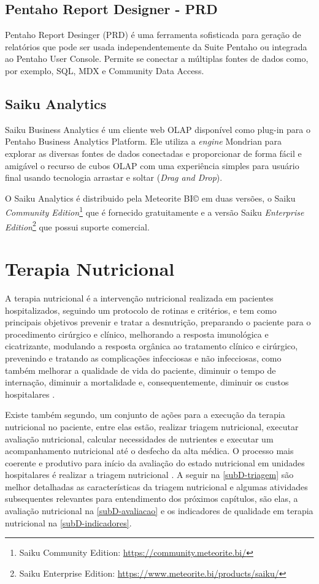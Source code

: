 \subsection{Pentaho Report Designer - PRD}
Pentaho Report Desinger (PRD) é uma ferramenta sofisticada para geração de relatórios que pode ser usada independentemente da Suite Pentaho ou integrada ao Pentaho User Console. Permite se conectar a múltiplas fontes de dados como, por exemplo, SQL, MDX e Community Data Access.

\subsection{Saiku Analytics}
Saiku Business Analytics é um cliente web OLAP disponível como plug-in para o Pentaho Business Analytics Platform. Ele utiliza a \textit{engine} Mondrian para explorar as diversas fontes de dados conectadas e proporcionar de forma fácil e amigável o recurso de cubos OLAP com uma experiência simples para usuário final usando tecnologia arrastar e soltar (\textit{Drag and Drop}). 

O Saiku Analytics é distribuido pela Meteorite BI© em duas versões, o Saiku \textit{Community Edition}\footnote{Saiku Community Edition: \url{https://community.meteorite.bi/}} que é fornecido gratuitamente e a versão Saiku \textit{Enterprise Edition}\footnote{Saiku Enterprise Edition: \url{https://www.meteorite.bi/products/saiku/}} que possui suporte comercial.

\section{Terapia Nutricional}
A terapia nutricional é a intervenção nutricional realizada em pacientes hospitalizados, seguindo um protocolo de rotinas e critérios, e tem como principais objetivos prevenir e tratar a desnutrição, preparando o paciente para o procedimento cirúrgico e clínico, melhorando a resposta imunológica e cicatrizante, modulando a resposta orgânica ao tratamento clínico e cirúrgico, prevenindo e tratando as complicações infecciosas e não infecciosas, como também melhorar a qualidade de vida do paciente, diminuir o tempo de internação, diminuir a mortalidade e, consequentemente, diminuir os custos hospitalares \cite{manualnutricao2016, mcclave2013}. 

Existe também segundo,  um conjunto de ações para a execução da terapia nutricional no paciente, entre elas estão, realizar triagem nutricional, executar avaliação nutricional, calcular necessidades de nutrientes e executar um acompanhamento nutricional até o desfecho da alta médica. O processo mais coerente e produtivo para início da avaliação do estado nutricional em unidades hospitalares é realizar a triagem nutricional \cite{protocolonutricionaladulto}. A seguir na \autoref{subD-triagem} são melhor detalhadas as características da triagem nutricional e algumas atividades subsequentes relevantes para entendimento dos próximos capítulos, são elas, a avaliação nutricional na \autoref{subD-avaliacao} e os indicadores de qualidade em terapia nutricional na \autoref{subD-indicadores}. 

